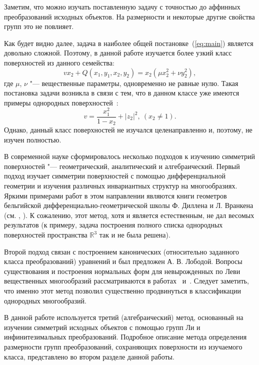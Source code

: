 \documentclass[../main.tex]{subfiles}
\begin{document}
Заметим, что можно изучать поставленную задачу с точностью до аффинных преобразований исходных объектов. На размерности и некоторые другие свойства групп это не повлияет.

Как будет видно далее, задача в наиболее общей постановке~(\ref{eq:main}) является довольно сложной. Поэтому, в данной работе изучается более узкий класс поверхностей из данного семейства:
\begin{equation}\label{eq:initial}
v x_2 + Q(x_1, y_1, x_2, y_2) = x_2 (\mu x_2^2 + \nu y_2^2),
\end{equation}
где $\mu$, $\nu$ "--- вещественные параметры, одновременно не равные нулю. Такая постановка задачи возникла в связи с тем, что в данном классе уже имеются примеры однородных поверхностей~\cite{ALS}:
\begin{equation}\label{eq:homogenous}
v = \frac{x_1^2}{1 - x_2} + |z_2|^2,\ (x_2 \ne 1).
\end{equation}
Однако, данный класс поверхностей не изучался целенаправленно и, поэтому, не изучен полностью.

В современной науке сформировалось несколько подходов к изучению симметрий поверхностей "--- геометрический, аналитический и алгебраический. Первый подход изучает симметрии поверхностей с помощью дифференциальной геометрии и изучения различных инвариантных структур на многообразиях. Яркими примерами работ в этом направлении являются книги геометров бельгийской дифференциально-геометрической школы Ф. Диллена и Л. Вранкена (см. \cite{dillen}, \cite{vrancken}). К сожалению, этот метод, хотя и является естественным, не дал весомых результатов (к примеру, задача построения полного списка однородных поверхностей пространства $\mathbb{R}^3$ так и не была решена).

Второй подход связан с построением канонических (относительно заданного класса преобразований) уравнений и был предложен А. В. Лободой. Вопросы существования и построения нормальных форм для невырожденных по Леви вещественных многообразий рассматриваются в работах~\cite{loboda_hodarev} и~\cite{danilov}. Следует заметить, что именно этот метод позволил существенно продвинуться в классификации однородных многообразий.

В данной работе используется третий (алгебраический) метод, основанный на изучении симметрий исходных объектов с помощью групп Ли и инфинитезимальных преобразований. Подробное описание метода определения размерности групп преобразований, сохраняющих поверхности из изучаемого класса, представлено во втором разделе данной работы.
\end{document}
